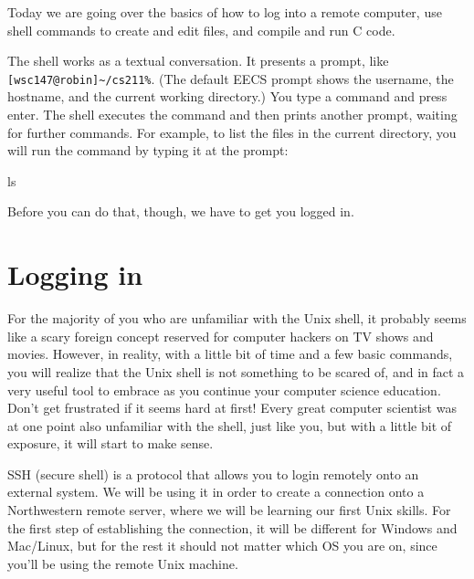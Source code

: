 \documentclass{tufte-handout}
\begin{document}
\maketitle

Today we are going over the basics of how to log into a remote computer,
use shell commands to create and edit files, and compile and run C code.

The shell works as a textual conversation. It presents a prompt, like
\verb![wsc147@robin]~/cs211%!. (The default EECS prompt shows the
username, the hostname, and the current working directory.) You type a
command and press enter. The shell executes the command and then prints
another prompt, waiting for further commands. For example, to list the
files in the current directory, you will run the  command
by typing it at the prompt:

\begin{CmdLine}
  \prompt ls
\end{CmdLine}


\noindent
Before you can do that, though, we have to get you logged in.

\section{Logging in}

For the majority of you who are unfamiliar with the Unix shell, it
probably seems like a scary foreign concept reserved for computer
hackers on TV shows and movies.  However, in reality, with a little bit
of time and a few basic commands, you will realize that the Unix shell
is not something to be scared of, and in fact a very useful tool to
embrace as you continue your computer science education. Don't get
frustrated if it seems hard at first! Every great computer scientist was
at one point also unfamiliar with the shell, just like you, but with a
little bit of exposure, it will start to make sense.

SSH (secure shell) is a protocol that allows you to login remotely onto
an external system. We will be using it in order to create a connection
onto a Northwestern remote server, where we will be learning our first
Unix skills. For the first step of establishing the connection, it will
be different for Windows and Mac/Linux, but for the rest it should not
matter which OS you are on, since you'll be using the remote Unix
machine.
\end{document}
